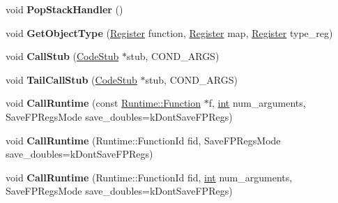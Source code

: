 \begin{DoxyCompactItemize}
void {\bfseries Pop\+Stack\+Handler} ()
\item 
\mbox{\label{classv8_1_1internal_1_1MacroAssembler_a09d1c8174d83d9bddd207035cfa4485b}} 
void {\bfseries Get\+Object\+Type} (\mbox{\hyperlink{classv8_1_1internal_1_1Register}{Register}} function, \mbox{\hyperlink{classv8_1_1internal_1_1Register}{Register}} map, \mbox{\hyperlink{classv8_1_1internal_1_1Register}{Register}} type\+\_\+reg)
\item 
\mbox{\label{classv8_1_1internal_1_1MacroAssembler_a4ec2ca530ed277164bbee74ece8cad73}} 
void {\bfseries Call\+Stub} (\mbox{\hyperlink{classv8_1_1internal_1_1CodeStub}{Code\+Stub}} $\ast$stub, C\+O\+N\+D\+\_\+\+A\+R\+GS)
\item 
\mbox{\label{classv8_1_1internal_1_1MacroAssembler_a5f804b8cbb30ef328ee2de51f3aa818e}} 
void {\bfseries Tail\+Call\+Stub} (\mbox{\hyperlink{classv8_1_1internal_1_1CodeStub}{Code\+Stub}} $\ast$stub, C\+O\+N\+D\+\_\+\+A\+R\+GS)
\item 
\mbox{\label{classv8_1_1internal_1_1MacroAssembler_a37081c297a4c533e549cc58167f7ccaa}} 
void {\bfseries Call\+Runtime} (const \mbox{\hyperlink{structv8_1_1internal_1_1Runtime_1_1Function}{Runtime\+::\+Function}} $\ast$f, \mbox{\hyperlink{classint}{int}} num\+\_\+arguments, Save\+F\+P\+Regs\+Mode save\+\_\+doubles=k\+Dont\+Save\+F\+P\+Regs)
\item 
\mbox{\label{classv8_1_1internal_1_1MacroAssembler_a797b53d578cd762b40c56f4485bf584e}} 
void {\bfseries Call\+Runtime} (Runtime\+::\+Function\+Id fid, Save\+F\+P\+Regs\+Mode save\+\_\+doubles=k\+Dont\+Save\+F\+P\+Regs)
\item 
\mbox{\label{classv8_1_1internal_1_1MacroAssembler_a87a8fd8a93b463d8485753c6d0d0465e}} 
void {\bfseries Call\+Runtime} (Runtime\+::\+Function\+Id fid, \mbox{\hyperlink{classint}{int}} num\+\_\+arguments, Save\+F\+P\+Regs\+Mode save\+\_\+doubles=k\+Dont\+Save\+F\+P\+Regs)
\item 
\mbox{\label{classv8_1_1internal_1_1MacroAssembler_aefb569829758555a7394ce1d34ed2bef}} 

\end{DoxyCompactItemize}

